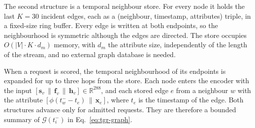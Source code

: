 The second structure is a temporal neighbour store. For every node it holds the last
$K = 30$ incident edges, each as a (neighbour, timestamp, attributes) triple, in a
fixed-size ring buffer. Every edge is written at both endpoints, so the neighbourhood is
symmetric although the edges are directed. The store occupies
$O(|V| \cdot K \cdot d_m)$ memory, with $d_m$ the attribute size, independently of the
length of the stream, and no external graph database is needed.

When a request is scored, the temporal neighbourhood of its endpoints is expanded for up
to three hops from the store. Each node enters the encoder with the input
$\left[\mathbf{s}_v \,\|\, \mathbf{f}_v \,\|\, \mathbf{h}_v\right] \in \mathbb{R}^{288}$,
and each stored edge $e$ from a neighbour $w$ with the attribute
$\left[\phi(t_w^{-} - t_e) \,\|\, \mathbf{x}_e\right]$, where $t_e$ is the timestamp of the
edge. Both structures advance only for
admitted requests. They are therefore a bounded summary of $\mathcal{G}(t_i^-)$ in
Eq.~\eqref{eq:tgr-graph}.
